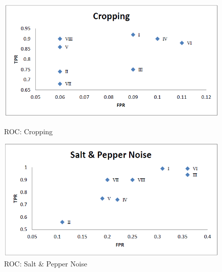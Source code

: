 \documentclass[12pt,a4paper]{jihmsp}
\begin{document}
{{%

\begin{figure}[h]
	\begin{multicols}{2}
		\includegraphics[width=\linewidth]{1cropping.png}\par\caption{ROC: Cropping}
		\includegraphics[width=\linewidth]{2saltandpepper.png}\par\caption{ROC: Salt \& Pepper Noise}
		
	\end{multicols}
\end{figure}

}}
\end{document}
